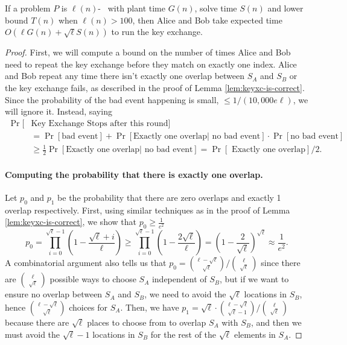 \begin{lemma}\label{lem:alice-bob-time}
	If a problem $P$ is $\ell(n)$-\keyER~ with plant time $G(n)$, solve time $S(n)$ and lower bound $T(n)$ when $\ell(n)>100$,
	then Alice and Bob take expected time $O(\ell G(n) + \sqrt{\ell} S(n))$ to run the key exchange.
\end{lemma}
\begin{proof}
	First, we will compute a bound on the number of times Alice and Bob need to repeat the key exchange before they match on exactly one index. Alice and Bob repeat any time there isn't exactly one overlap between $S_A$ and $S_B$ or the key exchange fails, as described in the proof of Lemma \ref{lem:keyxc-is-correct}. Since the probability of the bad event happening is small, $\le 1/(10,000 e \ell)$, we will ignore it. Instead, saying
	\begin{align*}
	\Pr[&\mbox{Key Exchange Stops after this round}]\\
	&= \Pr[\mbox{bad event}] + \Pr[\mbox{Exactly one overlap} | \mbox{ no bad event}] \cdot\Pr[\mbox{no bad event}]\\
	&\ge \frac 1 2 \Pr[\mbox{Exactly one overlap} | \mbox{ no bad event}] = \Pr[\mbox{ Exactly one overlap}]/2.
	\end{align*}
	
	\paragraph{Computing the probability that there is exactly one overlap.} Let $p_0$ and $p_1$ be the probability that there are zero overlaps and exactly 1 overlap respectively. First, using similar techniques as in the proof of Lemma \ref{lem:keyxc-is-correct}, we show that $p_0 \ge \frac 1 {e^2}$
	\[ 
	p_0 %
	= \prod_{i=0}^{\sqrt \ell-1} (1 - \frac{\sqrt{\ell} + i}{\ell})
	\ge \prod_{i=0}^{\sqrt{\ell} - 1} \left( 1 - \frac{2\sqrt{\ell}}{\ell} \right)
	= \left( 1 - \frac{2}{\sqrt{\ell}} \right)^{\sqrt{\ell}} \approx \frac{1}{e^2}.
	\]
	A combinatorial argument also tells us that $p_0 = \binom{\ell - \sqrt{\ell}}{\sqrt{\ell}} / \binom{\ell}{\sqrt{\ell}}$ since there are $\binom{\ell}{\sqrt{\ell}}$ possible ways to choose $S_A$ independent of $S_B$, but if we want to ensure no overlap between $S_A$ and $S_B$, we need to avoid the $\sqrt{\ell}$ locations in $S_B$, hence $\binom{\ell - \sqrt{\ell}}{\sqrt{\ell}}$ choices for $S_A$. Then, we have $p_1 = \sqrt{\ell} \cdot \binom{\ell - \sqrt{\ell}}{\sqrt{\ell} - 1} / \binom{\ell}{\sqrt{\ell}}$ because there are $\sqrt{\ell}$ places to choose from to overlap $S_A$ with $S_B$, and then we must avoid the $\sqrt{\ell} - 1$ locations in $S_B$ for the rest of the $\sqrt{\ell}$ elements in $S_A$.
	

\end{proof}
